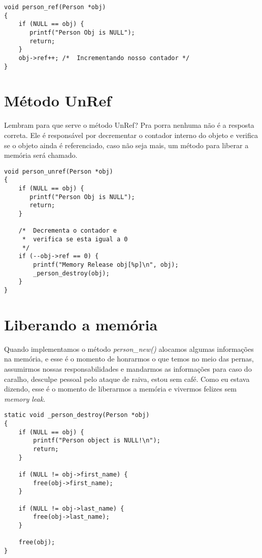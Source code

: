 \belowcaptionskip=-10pt
\begin{lstlisting}[label=some-code,caption=person\_ref()]
void person_ref(Person *obj)
{
    if (NULL == obj) {
       printf("Person Obj is NULL");
       return;
    }
    obj->ref++; /*  Incrementando nosso contador */
}
\end{lstlisting}

\section{Método UnRef}

Lembram para que serve o método UnRef? Pra porra nenhuma não é a resposta correta. Ele é responsável por decrementar o contador interno do objeto e verifica 
se o objeto ainda é referenciado, caso não seja mais, um método para liberar a memória será chamado.

\belowcaptionskip=-10pt
\begin{lstlisting}[label=some-code,caption=person\_unref()]
void person_unref(Person *obj)
{
    if (NULL == obj) {
       printf("Person Obj is NULL");
       return;
    }

    /*  Decrementa o contador e 
     *  verifica se esta igual a 0 
     */
    if (--obj->ref == 0) {
        printf("Memory Release obj[%p]\n", obj);
        _person_destroy(obj);
    }
}
\end{lstlisting}

\section{Liberando a memória}

Quando implementamos o método \textit{person\_new()} alocamos algumas informações na memória, e esse é o momento de honrarmos o que temos no meio das pernas, 
assumirmos nossas responsabilidades e mandarmos as informações para caso do caralho, desculpe pessoal pelo ataque de raiva, estou sem café. 
Como eu estava dizendo, esse é o momento de liberarmos a memória e vivermos felizes sem \textit{memory leak}. 
\vspace{50mm}
\belowcaptionskip=-10pt
\begin{lstlisting}[label=some-code,caption=\_person\_destroy()]
static void _person_destroy(Person *obj)
{
    if (NULL == obj) {
        printf("Person object is NULL!\n");
        return;
    }

    if (NULL != obj->first_name) {
        free(obj->first_name);
    }

    if (NULL != obj->last_name) {
        free(obj->last_name);
    }

    free(obj);
}
\end{lstlisting}


